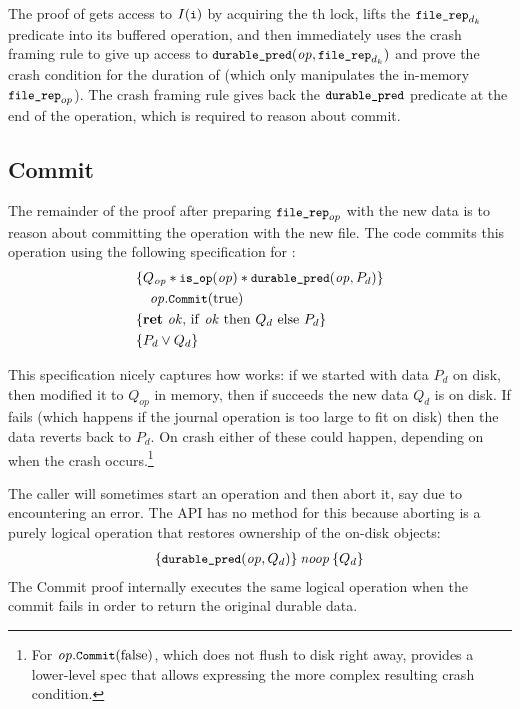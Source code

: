 The proof of  gets access to $I(\cc{i})$ by acquiring the
th lock, lifts the $\cc{file_rep}_{d_k}$ predicate into its buffered operation,
and then immediately uses the crash framing rule to give up access to
$\bufobjDurable(\mathit{op}, \cc{file_rep}_{d_k})$ and prove the crash condition for the
duration of  (which only manipulates the in-memory
$\cc{file_rep}_{op}$). The crash framing rule gives back the
$\bufobjDurable$ predicate at the end of the operation,
which is required to reason about commit.

\subsection{Commit}
\label{s:design:commit}

The remainder of the proof after preparing $\cc{file_rep}_{op}$ with the new
data is to reason about committing the operation with the new file. The code
commits this operation using the following specification for :
%
\begin{align*}
  \hoareCV{Q_{\mathit{op}} \sep \cc{is_op}(\mathit{op}) \sep \bufobjDurable(\mathit{op}, P_d)}%
  {\mathit{op}.\cc{Commit}(\mathrm{true})}%
  {\Ret{\mathit{ok}} \mathrm{if~} \mathit{ok} \mathrm{~then~} Q_d \mathrm{~else~} P_d}%
  {P_d \lor Q_d}
\end{align*}

This specification nicely captures how  works: if we started with data
$P_d$ on disk, then modified it to $Q_{op}$ in memory, then if  succeeds
the new data $Q_d$ is on disk. If  fails (which happens if the
journal operation is too large to fit on disk) then the data reverts back to $P_d$. On
crash either of these could happen, depending on when the crash
occurs.\footnote{For $\mathit{op}.\cc{Commit}(\mathrm{false})$, which
does not flush to disk right away, \txn provides a lower-level spec that
allows expressing the more complex resulting crash condition.}

The caller will sometimes start an operation and then abort it, say due to
encountering an error. The API has no method for this because aborting is a purely
logical operation that restores ownership of the on-disk objects:
%
\begin{align*}
  \hoare{\bufobjDurable(\mathit{op}, Q_{d})}{\SKIP}{Q_{d}}
\end{align*}
%
The Commit proof internally executes the same logical operation when the commit
fails in order to return the original durable data.


